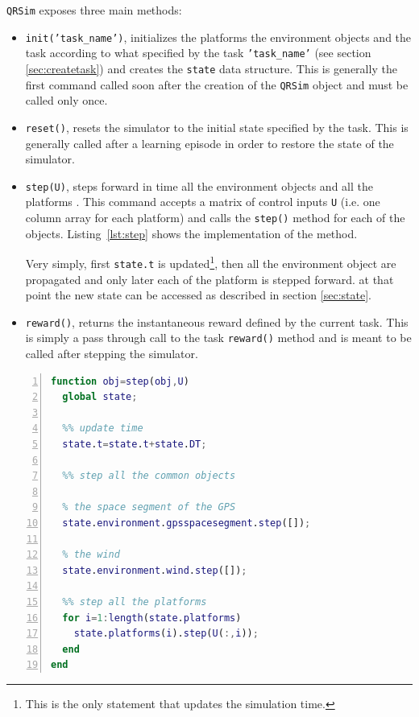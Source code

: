 \documentclass[a4paper,11pt]{report}
\newcommand{\sname}{QRSim\xspace}
\newcommand{\snamettt}{\texttt{QRSim}\xspace}
\begin{document}
\snamettt exposes three main methods:
\begin{itemize}
 \item \texttt{init('task\_name')}, initializes the platforms the environment objects and the task according to what specified by the task \texttt{'task\_name'} (see section \ref{sec:createtask}) and creates the \texttt{state} data structure. This is generally the first command called soon after the creation of the \snamettt object and must be called only once.
 \item \texttt{reset()}, resets the simulator to the initial state specified by the task. This is generally called after a learning episode in order to restore the state of the simulator. 
 \item \texttt{step(U)}, steps forward in time all the environment objects and all the platforms . This command accepts a matrix of control inputs \texttt{U} (i.e. one column array for each platform) and calls the \texttt{step()} method for each of the objects. Listing~\ref{lst:step} shows the implementation of the method.

Very simply, first \texttt{state.t} is updated\footnote{This is the only statement that updates the simulation time.}, then all the environment object are propagated and only later each of the platform is stepped forward. at that point the new state can be accessed as described in section \ref{sec:state}.
 \item \texttt{reward()}, returns the instantaneous reward defined by the current task. This is simply a pass through call to the task \texttt{reward()} method and is meant to be called after stepping the simulator.
\end{itemize}


\begin{lstlisting}[float=ht!bp,caption=\sname step() method,language=Matlab,frame=lines,label=lst:step,numbers=left,basicstyle=\small]
function obj=step(obj,U)
  global state;
           
  %% update time
  state.t=state.t+state.DT;
                        
  %% step all the common objects
            
  % the space segment of the GPS
  state.environment.gpsspacesegment.step([]);
            
  % the wind
  state.environment.wind.step([]);
            
  %% step all the platforms            
  for i=1:length(state.platforms)
    state.platforms(i).step(U(:,i));
  end
end
\end{lstlisting}
\end{document}
